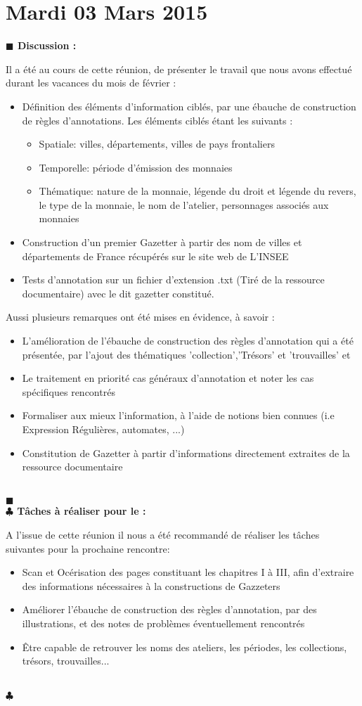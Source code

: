 \documentclass[a4paper, 10pt]{report}
\newenvironment{discussion}
    {
    \noindent\textbf{\textcolor{vert-1}{$\blacksquare$  Discussion : \\}}
    }
    {
    \noindent\textcolor{vert-1}{\\$\blacksquare$}\\
    }
\newenvironment{tache}[1][]
    {
    \noindent\textbf{\textcolor{vert-0}{$\clubsuit$  Tâches à réaliser pour le #1 : }}
    }
    {
    \noindent\textcolor{vert-0}{\\$\clubsuit$}\\
    }
\begin{document}
\section{Mardi 03 Mars 2015}
\begin{discussion}
Il a été au cours de cette réunion, de présenter le travail que nous avons effectué durant les vacances du mois de février :
\begin{itemize}
\item Définition des éléments d'information ciblés, par une ébauche de construction de règles d'annotations. Les éléments ciblés étant les suivants :
      \begin{itemize}
	\item Spatiale: villes, départements, villes de pays frontaliers
	\item Temporelle: période d'émission des monnaies
	\item Thématique: nature de la monnaie, légende du droit et légende du revers, le type de la monnaie, le nom de l'atelier, personnages associés aux monnaies
      \end{itemize}
\item Construction d'un premier Gazetter à partir des nom de villes et départements de France récupérés sur le site web de L'INSEE
\item Tests d'annotation sur un fichier d'extension .txt (Tiré de la ressource documentaire) avec le dit gazetter constitué.
\end{itemize}
Aussi plusieurs remarques ont été mises en évidence, à savoir :
\begin{itemize}
 \item L'amélioration de l'ébauche de construction des règles d'annotation qui a été présentée, par l'ajout des thématiques 'collection','Trésors' et 'trouvailles' et 
 \item Le traitement en priorité cas généraux d'annotation et noter les cas spécifiques rencontrés
 \item Formaliser aux mieux l'information, à l'aide de notions bien connues (i.e Expression Régulières, automates, ...)
 \item Constitution de Gazetter à partir d'informations directement extraites de la ressource documentaire
\end{itemize}
\end{discussion}
\begin{tache}
A l'issue de cette réunion il nous a été recommandé de réaliser les tâches suivantes pour la prochaine rencontre:
\begin{itemize}
 \item Scan et Océrisation des pages constituant les chapitres I à III, afin d'extraire des informations nécessaires à la constructions de Gazzeters
 \item Améliorer l'ébauche de construction des règles d'annotation, par des illustrations, et des notes de problèmes éventuellement rencontrés
 \item Être capable de retrouver les noms des ateliers, les périodes, les collections, trésors, trouvailles...
\end{itemize}
\end{tache}
\end{document}
